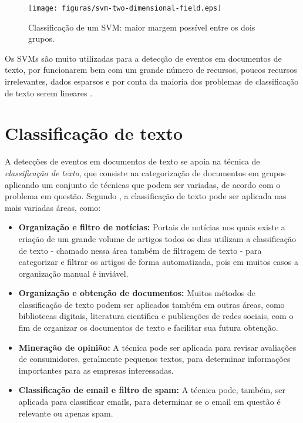 \begin{figure}[htpb]
	\begin{center}
		\texttt{[image: figuras/svm-two-dimensional-field.eps]}
		\caption{Classificação de um SVM: maior margem possível entre os dois grupos.}
	\end{center}
\end{figure}

Os SVMs são muito utilizadas para a detecção de eventos em documentos de texto, por funcionarem bem com um grande número de recursos, poucos recursos irrelevantes, dados esparsos e por conta da maioria dos problemas de classificação de texto serem lineares \cite{Joachims1998}.

\section{Classificação de texto}

A detecções de eventos em documentos de texto se apoia na técnica de \textit{classificação de texto}, que consiste na categorização de documentos em grupos aplicando um conjunto de técnicas que podem ser variadas, de acordo com o problema em questão. Segundo , a classificação de texto pode ser aplicada nas mais variadas áreas, como:

\begin{itemize}
	\item \textbf{Organização e filtro de notícias:} Portais de notícias nos quais existe a criação de um grande volume de artigos todos os dias utilizam a classificação de texto - chamado nessa área também de filtragem de texto - para categorizar e filtrar os artigos de forma automatizada, pois em muitos casos a organização manual é inviável.
	\item \textbf{Organização e obtenção de documentos:} Muitos métodos de classificação de texto podem ser aplicados também em outras áreas, como bibliotecas digitais, literatura científica e publicações de redes sociais, com o fim de organizar os documentos de texto e facilitar sua futura obtenção.
	\item \textbf{Mineração de opinião:} A técnica pode ser aplicada para revisar avaliações de consumidores, geralmente pequenos textos, para determinar informações importantes para as empresas interessadas.
	\item \textbf{Classificação de email e filtro de spam:} A técnica pode, também, ser aplicada para classificar emails, para determinar se o email em questão é relevante ou apenas spam.
\end{itemize}

